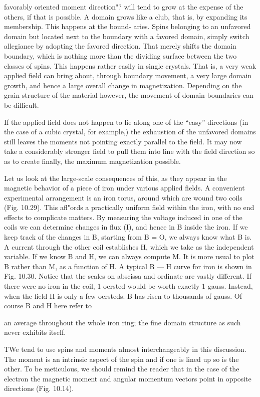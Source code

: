 {{{%
 

favorably oriented moment direction"? will tend to grow at the expense
of the others, if that is possible. A domain grows like a club,
that is, by expanding its membership. This happens at the bound-
aries. Spins belonging to an unfavored domain but located next to
the boundary with a favored domain, simply switch allegiance by
adopting the favored direction. That merely shifts the domain
boundary, which is nothing more than the dividing surface between
the two classes of spins. This happens rather easily in single crystals.
That is, a very weak applied field can bring about, through boundary
movement, a very large domain growth, and hence a large overall
change in magnetization. Depending on the grain structure of the
material however, the movement of domain boundaries can be
diflicult.

If the applied field does not happen to lie along one of the ``easy''
directions (in the case of a cubic crystal, for example,) the exhaustion
of the unfavored domains still leaves the moments not pointing
exactly parallel to the field. It may now take a considerably stronger
field to pull them into line with the field direction so as to create
finally, the maximum magnetization possible.

Let us look at the large-scale consequences of this, as they appear
in the magnetic behavior of a piece of iron under various applied
fields. A convenient experimental arrangement is an iron torus,
around which are wound two coils (Fig. 10.29). This afl"ords a
practically uniform field within the iron, with no end effects to complicate
matters. By measuring the voltage induced in one of the
coils we can determine changes in flux (I), and hence in B inside the
iron. If we keep track of the changes in B, starting from B = O, we
always know what B is. A current through the other coil establishes
H, which we take as the independent variable. If we know B and H,
we can always compute M. It is more usual to plot B rather than M,
as a function of H. A typical B --- H curve for iron is shown in
Fig. 10.30. Notice that the scales on abscissa and ordinate are vastly
different. If there were no iron in the coil, 1 oersted would be worth
exactly 1 gauss. Instead, when the field H is only a few oersteds.
B has risen to thousands of gauss. Of course B and H here refer to

an average throughout the whole iron ring; the fine domain structure
as such never exhibits itself.

TWe tend to use spins and moments almost interchangeably in this discussion. The
moment is an intrinsic aspect of the spin and if one is lined up so is the other. To be
meticulous, we should remind the reader that in the case of the electron the magnetic
moment and angular momentum vectors point in opposite directions (Fig. 10.14).

}}}
